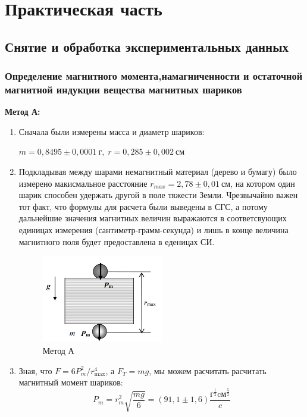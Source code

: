 \documentclass[a4paper, 12pt]{article}
\begin{document}
\section{Практическая часть}
\subsection{Снятие и обработка экспериментальных данных}
\subsubsection{Определение магнитного момента,намагниченности и остаточной магнитной индукции вещества магнитных шариков}
\textbf{Метод А:}
\begin{enumerate}
    \item Сначала были измерены масса и диаметр шариков:
    \begin{center}
    $m=0,8495 \pm 0,0001 \: \text{г}, \; r = 0,285 \pm 0,002 \: \text{см}$    
    \end{center}
    \item Подкладывая между шарами немагнитный материал (дерево и бумагу) было измерено макисмальное расстояние $r_{max} = 2,78  \pm 0,01 \: \text{см}$, на котором один шарик способен удержать другой в поле тяжести Земли. Чрезвычайно важен тот факт, что формулы для расчета были выведены в СГС, а потому дальнейшие значения магнитных величин выражаются в соответсвующих единицах измерения (сантиметр-грамм-секунда) и лишь в конце величина магнитного поля будет предоставлена в еденицах СИ.
    \begin{figure}[h]
    \begin{center}
    \includegraphics[width=0.5\textwidth]{метод А.png}
    \end{center}
    \caption{Метод А}
    \end{figure}
    \item Зная, что $F=6 P_{m}^{2} / r_{\max }^{4}$, а  $F_{T} = mg$, мы можем расчитать расчитать магнитный момент шариков:
    \begin{displaymath} P_{m}=r_{m}^{2} \sqrt{\frac{m g}{6}} = (91,1 \pm 1,6)  \frac{\text{г}^{\frac{1}{2}} \text{cм}^{\frac{5}{2}}}{c}\end{displaymath}

\end{enumerate}
\end{document}
